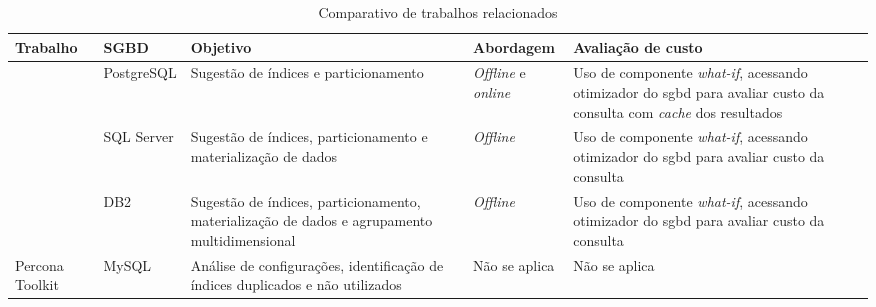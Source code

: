 \begin{table}[H]
  \centering
  \caption{Comparativo de trabalhos relacionados}
  \begin{tabular}{|p{2.1cm}|l|p{4.1cm}|p{2.1cm}|p{3.1cm}|} \hline
    \textbf{Trabalho}
        & \textbf{SGBD}
        & \textbf{Objetivo}
        & \textbf{Abordagem}
        & \textbf{Avaliação de custo}
        \\ \hline

    \citet{Alagiannis:2010}
        & PostgreSQL
        & Sugestão de índices e particionamento
        & \emph{Offline} e \emph{online}
        & Uso de componente \emph{what-if}, acessando otimizador do \gls{sgbd} para avaliar custo da consulta com \emph{cache} dos resultados
        \\ \hline
    \citet{Agrawal:2004}
        & SQL Server
        & Sugestão de índices, particionamento e materialização de dados
        & \emph{Offline}
        & Uso de componente \emph{what-if}, acessando otimizador do \gls{sgbd} para avaliar custo da consulta
        \\ \hline
    \citet{Zilio:2004}
        & DB2
        & Sugestão de índices, particionamento, materialização de dados e agrupamento multidimensional
        & \emph{Offline}
        & Uso de componente \emph{what-if}, acessando otimizador do \gls{sgbd} para avaliar custo da consulta
        \\ \hline
    Percona Toolkit
        & MySQL
        & Análise de configurações, identificação de índices duplicados e não utilizados
        & Não se aplica
        & Não se aplica
        \\ \hline
  \end{tabular}
  \label{tab:trabalhos-relacionados}
\end{table}
